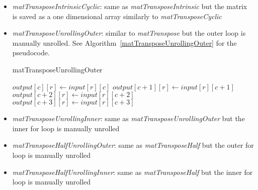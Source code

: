 \documentclass[conference]{IEEEtran}
\begin{document}
\begin{itemize}
\begin{algorithm}
\begin{algorithmic}[1]
    \end{algorithmic}
    \end{algorithm}

\item \textit{matTransposeIntrinsicCyclic}: same as \textit{matTransposeIntrinsic} but the matrix is saved as a one dimensional array similarly to \textit{matTransposeCyclic}
\item \textit{matTransposeUnrollingOuter}: similar to \textit{matTranspose} but the outer loop is manually unrolled. See Algorithm~\ref{matTransposeUnrollingOuter} for the pseudocode.

  \begin{algorithm}
    \caption{matTransposeUnrollingOuter}\label{matTransposeUnrollingOuter}
    \begin{algorithmic}[1]
            \State $output[c][r] \gets input[r][c]$
            \State $output[c+1][r] \gets input[r][c+1]$
            \State $output[c+2][r] \gets input[r][c+2]$
            \State $output[c+3][r] \gets input[r][c+3]$
            \EndFor
        \EndFor
    \end{algorithmic}
  \end{algorithm}

\item \textit{matTransposeUnrollingInner}: same as \textit{matTransposeUnrollingOuter} but the inner for loop is manually unrolled

\item \textit{matTransposeHalfUnrollingOuter}: same as \textit{matTransposeHalf} but the outer for loop is manually unrolled

\item \textit{matTransposeHalfUnrollingInner}: same as \textit{matTransposeHalf} but the inner for loop is manually unrolled


\end{itemize}
\end{document}
